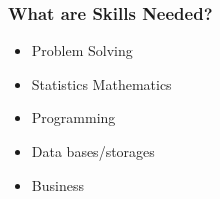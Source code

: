 







\begin{frame}[fragile]\frametitle{What are Skills Needed?}
\begin{itemize}
\item Problem Solving
\item Statistics Mathematics
\item Programming
\item Data bases/storages
\item Business
\end{itemize}
\end{frame}




 
